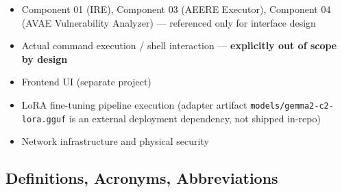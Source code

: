 \documentclass[10pt,journal,onecolumn]{IEEEtran}
\begin{document}
\begin{itemize}
\item Component 01 (IRE), Component 03 (AEERE Executor), Component 04 (AVAE Vulnerability Analyzer) --- referenced only for interface design
\item Actual command execution / shell interaction --- \textbf{explicitly out of scope by design}
\item Frontend UI (separate project)
\item LoRA fine-tuning pipeline execution (adapter artifact \texttt{models/\allowbreak gemma2-\allowbreak c2-\allowbreak lora.\allowbreak gguf} is an external deployment dependency, not shipped in-repo)
\item Network infrastructure and physical security
\end{itemize}

\subsection{Definitions, Acronyms, Abbreviations}
\end{document}
